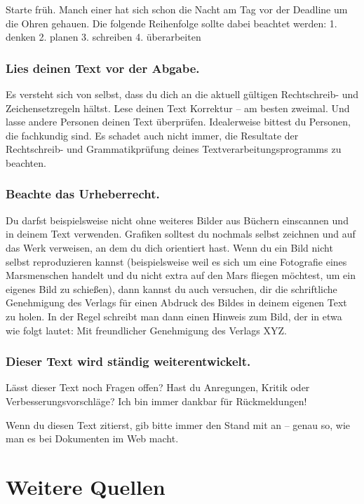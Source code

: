 \documentclass{../cssheet}
\begin{document}
Starte früh. Manch einer hat sich schon die Nacht am Tag vor der
Deadline um die Ohren gehauen. Die folgende Reihenfolge sollte dabei
beachtet werden: 1. denken 2. planen 3. schreiben 4. überarbeiten

\subsubsection*{Lies deinen Text vor der Abgabe.}

Es versteht sich von selbst, dass du dich an die aktuell gültigen
Rechtschreib- und Zeichensetzregeln hältst. Lese deinen Text Korrektur
-- am besten zweimal. Und lasse andere Personen deinen Text überprüfen.
Idealerweise bittest du Personen, die fachkundig sind. Es schadet auch
nicht immer, die Resultate der Rechtschreib- und Grammatikprüfung deines
Textverarbeitungsprogramms zu beachten.

\subsubsection*{Beachte das Urheberrecht.}

Du darfst beispielsweise nicht ohne weiteres Bilder aus Büchern
einscannen und in deinem Text verwenden. Grafiken solltest du nochmals
selbst zeichnen und auf das Werk verweisen, an dem du dich orientiert
hast. Wenn du ein Bild nicht selbst reproduzieren kannst (beispielsweise
weil es sich um eine Fotografie eines Marsmenschen handelt und du nicht
extra auf den Mars fliegen möchtest, um ein eigenes Bild zu schießen),
dann kannst du auch versuchen, dir die schriftliche Genehmigung des
Verlags für einen Abdruck des Bildes in deinem eigenen Text zu holen. In
der Regel schreibt man dann einen Hinweis zum Bild, der in etwa wie
folgt lautet: \glqq{}Mit freundlicher Genehmigung des Verlags XYZ\grqq{}.

\subsubsection*{Dieser Text wird ständig weiterentwickelt.}

Lässt dieser Text noch Fragen offen? Hast du Anregungen, Kritik oder
Verbesserungsvorschläge? Ich bin immer dankbar für Rückmeldungen!

Wenn du diesen Text zitierst, gib bitte immer den Stand mit an --
genau so, wie man es bei Dokumenten im Web macht.

\section{Weitere Quellen}
\end{document}
